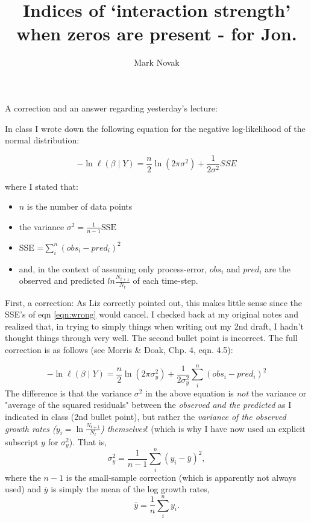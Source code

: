 \documentclass{article}
\author{Mark Novak}
\title{Indices of `interaction strength' when zeros are present - for Jon.}
\begin{document}
A correction and an answer regarding yesterday's lecture:

In class I wrote down the following equation for the negative log-likelihood of the normal distribution:

\begin{equation}
\label{eqn:wrong}
	-\ln \ell (\beta \mid Y) = \frac{n}{2} \ln (2 \pi \sigma^2)  + \frac{1}{2 \sigma^2}  SSE
\end{equation}

where I stated that:
\begin{itemize}
	\item $n$ is the number of data points
	\item the variance $\sigma^2 = \frac{1}{n-1} \text{SSE}$
	\item SSE =$ \sum_i^n (obs_i- pred_i)^2$
	\item and, in the context of assuming only process-error,  $obs_i$ and $pred_i$ are the observed and predicted $ln \frac{N_{t+1}}{N_t}$ of each time-step.
\end{itemize}
First, a correction:  As Liz correctly pointed out, this makes little sense since the SSE's of eqn \ref{eqn:wrong} would cancel.  I checked back at my original notes and realized that, in trying to simply things when writing out my 2nd draft, I hadn't thought things through very well.  The second bullet point is incorrect.  The full correction is as follows (see Morris \& Doak, Chp. 4, eqn. 4.5):

\begin{equation}
	\label{eqn:right}
	-\ln \ell (\beta \mid Y)=  \frac{n}{2} \ln (2 \pi \sigma_y^2)  + \frac{1}{2 \sigma_y^2}  \sum_i^n (obs_i- pred_i)^2
\end{equation}
The difference is that the variance $\sigma^2$ in the above equation is \emph{not} the variance or "average of the squared residuals" between the \emph{ observed and the predicted} as I indicated in class (2nd bullet point), but rather the \emph{variance of the observed growth rates ($y_i=\ln \frac{N_{t+1}}{N_t}$) themselves}! (which is why I have now used an explicit subscript $y$ for $\sigma_y^2$).  That is,
\begin{equation}
	\sigma_y^2  = \frac{1}{n-1} \sum_i^n (y_i - \bar{y})^2,
\end{equation}
where the $n-1$ is the small-sample correction (which is apparently not always used) and $\bar{y}$ is simply the mean of the log growth rates, 
\begin{equation}
	\bar{y}=\frac{1}{n}\sum_i^n y_i.
\end{equation}
\end{document}
